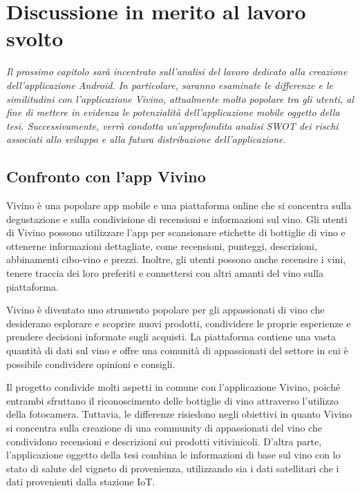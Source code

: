 \chapter{Discussione in merito al lavoro svolto}

\begin{preamble}
{\em
Il prossimo capitolo sarà incentrato sull'analisi del lavoro dedicato alla creazione dell'applicazione Android. In particolare, saranno esaminate le differenze e le similitudini con l'applicazione Vivino, attualmente molto popolare tra gli utenti, al fine di mettere in evidenza le potenzialità dell'applicazione mobile oggetto della tesi. \newline \indent Successivamente, verrà condotta un'approfondita analisi SWOT dei rischi associati allo sviluppo e alla futura distribuzione dell'applicazione.
}
\end{preamble}

\section{Confronto con l'app Vivino}

Vivino è una popolare app mobile e una piattaforma online che si concentra sulla degustazione e sulla condivisione di recensioni e informazioni sul vino. Gli utenti di Vivino possono utilizzare l'app per scansionare etichette di bottiglie di vino e ottenerne informazioni dettagliate, come recensioni, punteggi, descrizioni, abbinamenti cibo-vino e prezzi. Inoltre, gli utenti possono anche recensire i vini, tenere traccia dei loro preferiti e connettersi con altri amanti del vino sulla piattaforma.

Vivino è diventato uno strumento popolare per gli appassionati di vino che desiderano esplorare e scoprire nuovi prodotti, condividere le proprie esperienze e prendere decisioni informate sugli acquisti. La piattaforma contiene una vasta quantità di dati sul vino e offre una comunità di appassionati del settore in cui è possibile condividere opinioni e consigli.

Il progetto condivide molti aspetti in comune con l'applicazione Vivino, poiché entrambi sfruttano il riconoscimento delle bottiglie di vino attraverso l'utilizzo della fotocamera. Tuttavia, le differenze risiedono negli obiettivi in quanto Vivino si concentra sulla creazione di una community di appassionati del vino che condividono recensioni e descrizioni sui prodotti vitivinicoli. D'altra parte, l'applicazione oggetto della tesi combina le informazioni di base sul vino con lo stato di salute del vigneto di provenienza, utilizzando sia i dati satellitari che i dati provenienti dalla stazione IoT.

